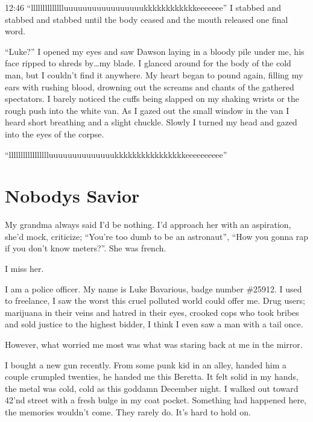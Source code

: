 12:46
``lllllllllllllluuuuuuuuuuuuuuuuukkkkkkkkkkkkeeeeeee'' I
stabbed and stabbed and stabbed until the body ceased and the mouth
released one final word.

``Luke?'' I opened my eyes and saw Dawson laying in a
bloody pile under me, his face ripped to shreds by{\ldots}my blade. I
glanced around for the body of the cold man, but I couldn't find it
anywhere. My heart began to pound again, filling my ears with
rushing blood, drowning out the screams and chants of the gathered
spectators. I barely noticed the cuffs being slapped on my shaking
wrists or the rough push into the white van. As I gazed out the
small window in the van I heard short breathing and a slight
chuckle. Slowly I turned my head and gazed into the eyes of the
corpse.

``llllllllllllllllluuuuuuuuuuuuuukkkkkkkkkkkkkkkkeeeeeeeeee''

 



\chapter{Nobodys Savior}





My grandma always said I'd be nothing. I'd approach her with an
aspiration, she'd mock, criticize; ``You're too dumb to be an
astronaut'', ``How you gonna rap if you don't know meters?''. She was
french.



I miss her.



I am a police officer. My name is Luke Bavarious, badge number
\#25912. I used to freelance, I saw the worst this cruel polluted
world could offer me. Drug users; marijuana in their veins and
hatred in their eyes, crooked cops who took bribes and sold justice
to the highest bidder, I think I even saw a man with a tail
once.



However, what worried me most was what was staring back at me in
the mirror.



I bought a new gun recently. From some punk kid in an alley, handed
him a couple crumpled twenties, he handed me this Beretta. It felt
solid in my hands, the metal was cold, cold as this goddamn
December night. I walked out toward 42'nd street with a fresh bulge
in my coat pocket. Something had happened here, the memories
wouldn't come. They rarely do. It's hard to hold on.



